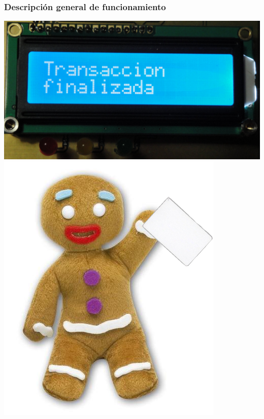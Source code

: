 \documentclass{beamer}
\begin{document}
\begin{frame}
	\frametitle{Descripción general de funcionamiento}
	\begin{center}
		\includegraphics[scale=.08]{Imagenes/fin.jpg}
		\includegraphics[scale=.35]{Imagenes/pinpon_tarj.png}
	\end{center}
\end{frame}	
\end{document}
